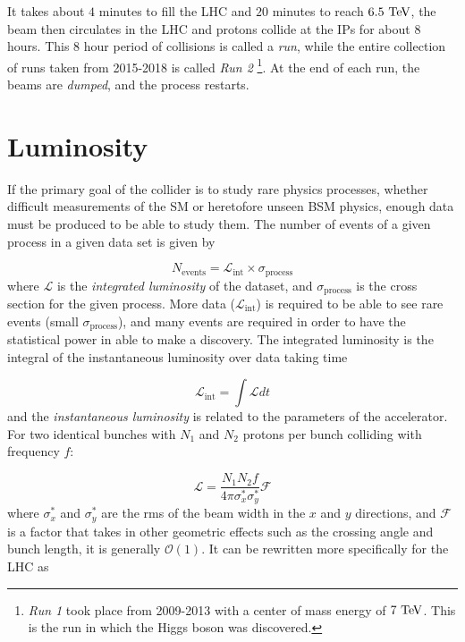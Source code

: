 It takes about $4$ minutes to fill the \ac{LHC} and $20$ minutes to reach $6.5 \TeV$, the beam then circulates in the \ac{LHC} and protons collide at the \ac{IP}s for about $8$ hours. This $8$ hour period of collisions is called a \emph{run}, while the entire collection of runs taken from 2015-2018 is called \emph{Run 2} \footnote{\emph{Run 1} took place from 2009-2013 with a center of mass energy of $7 \TeV$. This is the run in which the Higgs boson was discovered.}. At the end of each run, the beams are \emph{dumped}, and the process restarts. 

\section{Luminosity}

If the primary goal of the collider is to study rare physics processes, whether difficult measurements of the \ac{SM} or heretofore unseen \ac{BSM} physics, enough data must be produced to be able to study them. The number of events of a given process in a given data set is given by

\begin{equation}
N_{\textrm{events}} = \mathcal{L}_{\textrm{int}} \times \sigma_{\textrm{process}}
\label{eq:nevents_lumi}
\end{equation}
where $\mathcal{L}$ is the \emph{integrated luminosity} of the dataset, and $\sigma_{\textrm{process}}$ is the cross section for the given process. More data ($\mathcal{L}_{\textrm{int}}$) is required to be able to see rare events (small $\sigma_{\textrm{process}}$), and many events are required in order to have the statistical power in able to make a discovery. The integrated luminosity is the integral of the instantaneous luminosity over data taking time

\begin{equation}
\mathcal{L}_{\textrm{int}} = \int \mathcal{L} dt
\end{equation}
and the \emph{instantaneous luminosity} is related to the parameters of the accelerator. For two identical bunches with $N_1$ and $N_2$ protons per bunch colliding with frequency $f$:

\begin{equation}
\mathcal{L} = \frac{N_1 N_2 f}{4\pi \sigma_x^* \sigma_y^*} \mathcal{F}
\end{equation}
where $\sigma_x^*$ and  $\sigma_y^*$ are the \ac{rms} of the beam width in the $x$ and $y$ directions, and $\mathcal{F}$ is a factor that takes in other geometric effects such as the crossing angle and bunch length, it is generally $\mathcal{O}(1)$. It can be rewritten more specifically for the \ac{LHC} as


